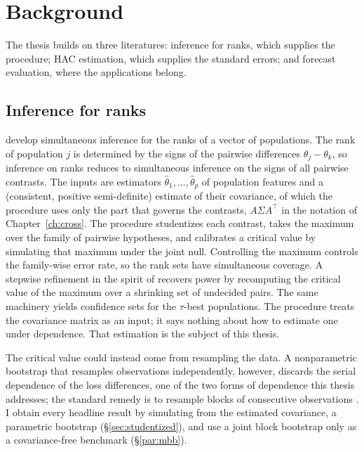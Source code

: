\chapter{Background}
\label{ch:background}

The thesis builds on three literatures: inference for ranks, which supplies the
procedure; HAC estimation, which supplies the standard errors; and forecast evaluation,
where the applications belong.

\section{Inference for ranks}
\label{sec:bg-mrsw}

\citet{mogstad2024} develop simultaneous inference for the ranks of a vector of
populations. The rank of population $j$ is determined by the signs of the pairwise
differences $\theta_j-\theta_k$, so inference on ranks reduces to simultaneous inference
on the signs of all pairwise contrasts. The inputs are estimators
$\hat\theta_1,\dots,\hat\theta_p$ of population features and a (consistent, positive
semi-definite) estimate of their covariance, of which the procedure uses only the part
that governs the contrasts, $A\Sigma A^\top$ in the notation of Chapter~\ref{ch:cross}.
The procedure studentizes each contrast, takes the maximum over the family of pairwise
hypotheses, and calibrates a critical value by simulating that maximum under the joint
null. Controlling the maximum controls the family-wise error rate, so the rank sets have
simultaneous coverage. A stepwise refinement in the spirit of \citet{romanowolf2005}
recovers power by recomputing the critical value of the maximum over a shrinking set of
undecided pairs. The same machinery yields confidence sets for the $\tau$-best
populations. The procedure treats the covariance matrix as an input; it says nothing
about how to estimate one under dependence. That estimation is the subject of this
thesis.

The critical value could instead come from resampling the data. A nonparametric
bootstrap that resamples observations independently, however, discards the serial
dependence of the loss differences, one of the two forms of dependence this thesis
addresses; the standard remedy is to resample blocks of consecutive observations
\citep{kunsch1989}. I obtain every headline result by simulating from the estimated
covariance, a parametric bootstrap (\S\ref{sec:studentized}), and use a joint block
bootstrap only as a covariance-free benchmark (\S\ref{par:mbb}).

